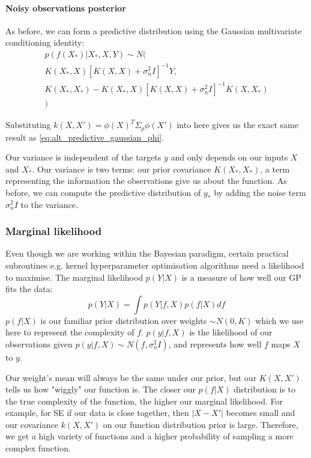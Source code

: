 \paragraph{Noisy observations posterior}
As before, we can form a predictive distribution using the Gaussian multivariate conditioning identity:
\begin{equation*}
    \begin{aligned}
        p(f(X_*)|X_*, X, Y) \sim N( \\
        K(X_*,X)[K(X,X) + \sigma^2_nI]^{-1}Y, \\
        K(X_*,X_*) - K(X_*,X)[K(X,X) + \sigma^2_nI]^{-1}K(X,X_*) \\
        )
    \end{aligned}
\end{equation*}

Substituting $k(X,X') = \phi(X)^T\Sigma_p\phi(X')$ into here gives us the exact same result as \ref{eq:alt_predictive_gaussian_phi}.

Our variance is independent of the targets $y$ and only depends on our inputs $X$ and $X_*$. Our variance is two terms: our prior covariance $K(X_*,X_*)$, a term representing the information the observations give us about the function. As before, we can compute the predictive distribution of $y_*$ by adding the noise term $\sigma^2_nI$ to the variance.

\subsubsection{Marginal likelihood}
Even though we are working within the Bayesian paradigm, certain practical subroutines e.g. kernel hyperparameter optimisation algorithms need a likelihood to maximise. The marginal likelihood $p(Y|X)$ is a measure of how well our GP fits the data:
\begin{equation} \label{eq:marginal_likelihood}
    p(Y|X) = \int p(Y|f,X)p(f|X) df
\end{equation}
$p(f|X)$ is our familiar prior distribution over weights $\sim N(0, K)$ which we use here to represent the complexity of $f$. $p(y|f,X)$ is the likelihood of our observations given $p(y|f,X) \sim N(f, \sigma^2_nI)$, and represents how well $f$ maps $X$ to $y$. 

Our weight's mean will always be the same under our prior, but our $K(X,X')$ tells us how "wiggly" our function is. The closer our $p(f|X)$ distribution is to the true complexity of the function, the higher our marginal likelihood. For example, for SE if our data is close together, then $|X - X'|$ becomes small and our covariance $k(X,X')$ on our function distribution prior is large. Therefore, we get a high variety of functions and a higher probability of sampling a more complex function. %
    
